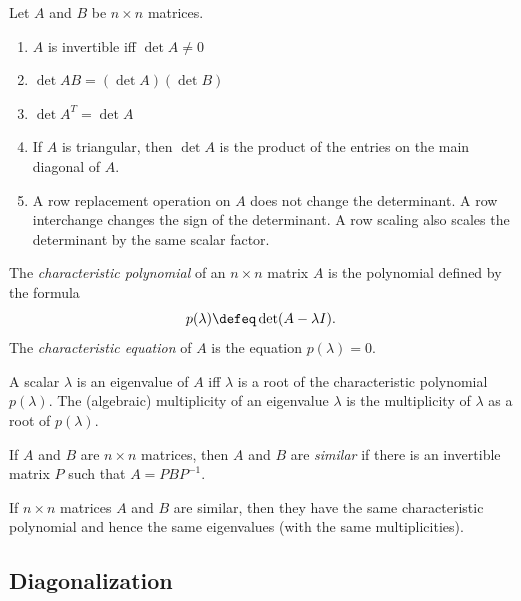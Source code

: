 \documentclass{article}
\begin{document}
\begin{thm} 
    Let \(A\) and \(B\) be \(n\times n\) matrices.
    \begin{enumerate}
        \item[a.] \(A\) is invertible iff \(\det{A}\neq0\)
        \item[b.] \(\det AB=(\det A)(\det B)\)
        \item[c.] \(\det A^T=\det A\)
        \item[d.] If \(A\) is triangular, then \(\det A\) is the product of the entries on the main diagonal of \(A\).
        \item[e.] A row replacement operation on \(A\) does not change the determinant. A row interchange changes the sign of the determinant. A row scaling also scales the determinant by the same scalar factor.
    \end{enumerate}
\end{thm}

\begin{defn}
    The \emph{characteristic polynomial} of an \(n\times n\) matrix \(A\) is the polynomial defined by the formula \[p(\lambda) \defeq \det(A-\lambda I).\] The \emph{characteristic equation} of \(A\) is the equation \(p(\lambda)=0\).
\end{defn}

\begin{rem}
    A scalar \(\lambda\) is an eigenvalue of \(A\) iff \(\lambda\) is a root of the characteristic polynomial \(p(\lambda)\). The (algebraic) multiplicity of an eigenvalue \(\lambda\) is the multiplicity of \(\lambda\) as a root of \(p(\lambda)\).
\end{rem}

\begin{defn}
    If \(A\) and \(B\) are \(n\times n\) matrices, then \(A\) and \(B\) are \emph{similar} if there is an invertible matrix \(P\) such that \(A=PBP^{-1}\).
\end{defn}

\begin{thm}
    If \(n\times n\) matrices \(A\) and \(B\) are similar, then they have the same characteristic polynomial and hence the same eigenvalues (with the same multiplicities).
\end{thm}

\subsection{Diagonalization}
\end{document}
